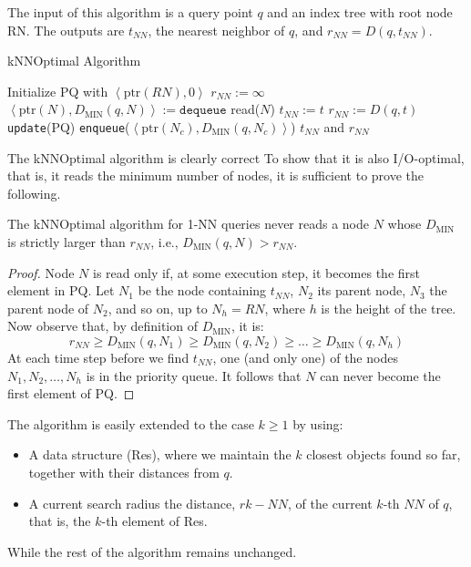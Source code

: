 The input of this algorithm is a query point $q$ and an index tree with root node RN. 
The outputs are $t_{NN}$, the nearest neighbor of $q$, and $r_{NN}=D(q,t_{NN})$. 
\begin{algorithm}[H]
    \caption{kNNOptimal Algorithm}
        \begin{algorithmic}[1]
            \State Initialize PQ with $\left\langle \text{ptr}(RN),0 \right\rangle $
            \State $r_{NN}:=\infty$
                \State $\left\langle \text{ptr}(N),D_{\text{MIN}}(q,N) \right\rangle := \texttt{dequeue}$
                \State read($N$)
                            \State $t_{NN} := t$
                            \State $r_{NN} := D(q,t)$
                            \State \texttt{update}(PQ)
                        \EndIf
                    \EndFor
                \Else 
                            \State \texttt{enqueue}($\left\langle \text{ptr}(N_c),D_{\text{MIN}}(q,N_c) \right\rangle$)
                        \EndIf 
                    \EndFor
                \EndIf
            \EndWhile 
            \State \Return $t_{NN}$ and $r_{NN}$
        \end{algorithmic}
\end{algorithm}

The kNNOptimal algorithm is clearly correct
To show that it is also I/O-optimal, that is, it reads the minimum number of nodes, it is sufficient to prove the following. 
\begin{theorem}
    The kNNOptimal algorithm for 1-NN queries never reads a node $N$ whose $D_{\text{MIN}}$ is strictly larger than $r_{NN}$, i.e., $D_{\text{MIN}}(q,N) > r_{NN}$. 
\end{theorem}
\begin{proof}
    Node $N$ is read only if, at some execution step, it becomes the first element in PQ. 
    Let $N_1$ be the node containing $t_{NN}$, $N_2$ its parent node, $N_3$ the parent node of $N_2$, and so on, up to $N_h = RN$, where $h$ is the height of the tree. 
    Now observe that, by definition of $D_{\text{MIN}}$, it is:
    \[r_{NN} \geq D_{\text{MIN}}(q,N_1) \geq D_{\text{MIN}}(q,N_2) \geq \dots \geq D_{\text{MIN}}(q,N_h)\]
    At each time step before we find $t_{NN}$, one (and only one) of the nodes $N_1,N_2,\dots,N_h$ is in the priority queue. 
    It follows that $N$ can never become the first element of PQ. 
\end{proof}
The algorithm is easily extended to the case $k \geq 1$ by using: 
\begin{itemize}
    \item A data structure (Res), where we maintain the $k$ closest objects found so far, together with their distances from $q$. 
    \item A current search radius the distance, $rk-NN$, of the current $k$-th $NN$ of $q$, that is, the $k$-th element of Res.
\end{itemize}
While the rest of the algorithm remains unchanged. 

